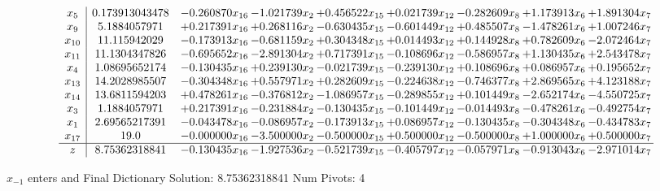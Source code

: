 \documentclass[10pt]{article}
\begin{document}
 \[\begin{array}{c| c c@{\hskip 2pt} c@{\hskip 2pt} c@{\hskip 2pt} c@{\hskip 2pt} c@{\hskip 2pt} c@{\hskip 2pt} c@{\hskip 2pt} }
 x_{5}   &  0.173913043478 & -0.260870 x_{16} & -1.021739 x_{2} & + 0.456522 x_{15} & + 0.021739 x_{12} & -0.282609 x_{8} & + 1.173913 x_{6} & + 1.891304 x_{7}\\
 x_{9}   &  5.1884057971 & + 0.217391 x_{16} & + 0.268116 x_{2} & -0.630435 x_{15} & -0.601449 x_{12} & + 0.485507 x_{8} & -1.478261 x_{6} & + 1.007246 x_{7}\\
 x_{10}   &  11.115942029 & -0.173913 x_{16} & -0.681159 x_{2} & + 0.304348 x_{15} & + 0.014493 x_{12} & + 0.144928 x_{8} & + 0.782609 x_{6} & -2.072464 x_{7}\\
 x_{11}   &  11.1304347826 & -0.695652 x_{16} & -2.891304 x_{2} & + 0.717391 x_{15} & -0.108696 x_{12} & -0.586957 x_{8} & + 1.130435 x_{6} & + 2.543478 x_{7}\\
 x_{4}   &  1.08695652174 & -0.130435 x_{16} & + 0.239130 x_{2} & -0.021739 x_{15} & -0.239130 x_{12} & + 0.108696 x_{8} & + 0.086957 x_{6} & + 0.195652 x_{7}\\
 x_{13}   &  14.2028985507 & -0.304348 x_{16} & + 0.557971 x_{2} & + 0.282609 x_{15} & -0.224638 x_{12} & -0.746377 x_{8} & + 2.869565 x_{6} & + 4.123188 x_{7}\\
 x_{14}   &  13.6811594203 & + 0.478261 x_{16} & -0.376812 x_{2} & -1.086957 x_{15} & -0.289855 x_{12} & + 0.101449 x_{8} & -2.652174 x_{6} & -4.550725 x_{7}\\
 x_{3}   &  1.1884057971 & + 0.217391 x_{16} & -0.231884 x_{2} & -0.130435 x_{15} & -0.101449 x_{12} & -0.014493 x_{8} & -0.478261 x_{6} & -0.492754 x_{7}\\
 x_{1}   &  2.69565217391 & -0.043478 x_{16} & -0.086957 x_{2} & -0.173913 x_{15} & + 0.086957 x_{12} & -0.130435 x_{8} & -0.304348 x_{6} & -0.434783 x_{7}\\
 x_{17}   &  19.0 & -0.000000 x_{16} & -3.500000 x_{2} & -0.500000 x_{15} & + 0.500000 x_{12} & -0.500000 x_{8} & + 1.000000 x_{6} & + 0.500000 x_{7}\\
\hline
z    &  8.75362318841 & -0.130435 x_{16} & -1.927536 x_{2} & -0.521739 x_{15} & -0.405797 x_{12} & -0.057971 x_{8} & -0.913043 x_{6} & -2.971014 x_{7}\\
\end{array}\]


 $ x_{-1} $ enters and Final Dictionary
Solution:  8.75362318841
Num Pivots:  4
\end{document}
